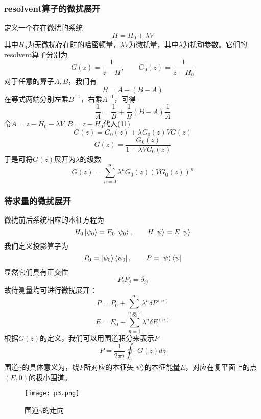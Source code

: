 \documentclass[12pt, a4paper, oneside]{ctexart}
\begin{document}
\subsubsection{resolvent算子的微扰展开}
定义一个存在微扰的系统
\begin{equation}
    H=H_0+\lambda V
\end{equation}
其中$H_0$为无微扰存在时的哈密顿量，$\lambda V$为微扰量，其中$\lambda$为扰动参数。它们的resolvent算子分别为
\begin{equation}
    G(z)=\frac{1}{z-H},\qquad G_0(z)=\frac{1}{z-H_0}
\end{equation}
对于任意的算子$A,B$，我们有
\begin{equation}
    B=A+(B-A)
\end{equation}
在等式两端分别左乘$B^{-1}$，右乘$A^{-1}$，可得
\begin{equation}
    \frac{1}{A}=\frac{1}{B}+\frac{1}{B}(B-A)\frac{1}{A}
\end{equation}
令$A=z-H_0-\lambda V,B=z-H_0$代入(11)
\begin{equation}
    G(z)=G_0(z)+\lambda G_0(z)VG(z)
\end{equation}
\begin{equation}
    G(z)=\frac{G_0(z)}{1-\lambda V G_0(z)}
\end{equation}
于是可将$G(z)$展开为$\lambda$的级数
\begin{equation}
    G(z)=\sum_{n=0}^{\infty}\lambda^n G_0(z)(VG_0(z))^n
\end{equation}
\subsubsection{待求量的微扰展开}
微扰前后系统相应的本征方程为
\begin{equation}
    H_0\ket{\psi_0}=E_0\ket{\psi_0},\qquad H\ket{\psi}=E\ket{\psi}
\end{equation}
我们定义投影算子为
\begin{equation}
    P_0=\ket{\psi_0}\bra{\psi_0},\qquad  P=\ket{\psi}\bra{\psi}
\end{equation}
显然它们具有正交性
\begin{equation}
    P_i P_j=\delta _{ij}
\end{equation}
故待测量均可进行微扰展开：
\begin{equation}
    P=P_0+\sum_{n=1}^{\infty}\lambda^n \delta P^{(n)}
\end{equation}
\begin{equation}
    E=E_0+\sum_{n=1}^{\infty}\lambda^n \delta E^{(n)}
\end{equation}
根据$G(z)$的定义，我们可以用围道积分来表示$P$
\begin{equation}
    P=\frac{1}{2\pi i}\oint _{\gamma}G(z)dz
\end{equation}
围道$\gamma$的具体意义为，绕$P$所对应的本征矢$\ket{\psi}$的本征能量$E$，对应在复平面上的点$(E,0)$的极小围道。
\begin{figure}[htbp]
    \centering
    \texttt{[image: p3.png]}
    \vspace{10pt} %
	\caption{围道$\gamma$的走向}
\end{figure}
\end{document}
